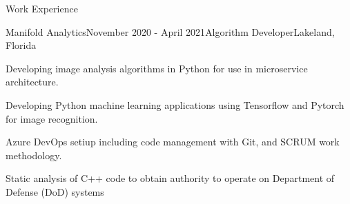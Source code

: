 \documentclass{resume} %
\begin{document}
\begin{rSection}{Work Experience}
	\begin{rSubsection}{Manifold Analytics}{November 2020 - April 2021}{Algorithm Developer}{Lakeland, Florida}
		\item Developing image analysis algorithms in Python for use in microservice architecture.
		\item Developing Python machine learning applications using Tensorflow and Pytorch for image recognition.
		\item Azure DevOps setiup including code management with Git, and SCRUM work methodology.
		\item Static analysis of C++ code to obtain authority to operate on Department of Defense (DoD) systems
	\end{rSubsection}
	
	
	
	\end{rSection}
	
\end{document}
